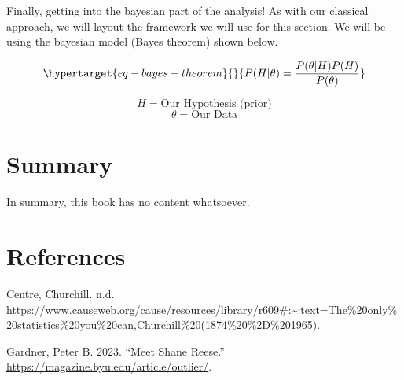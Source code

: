 \documentclass[
  letterpaper,
  DIV=11,
  numbers=noendperiod]{scrreprt}
\newlength{\cslhangindent}
\newlength{\cslentryspacingunit} %
\newenvironment{CSLReferences}[2] %
 {%
  \setlength{\parindent}{0pt}
  \ifodd #1
  \let\oldpar\par
  \def\par{\hangindent=\cslhangindent\oldpar}
  \fi
  \setlength{\parskip}{#2\cslentryspacingunit}
 }%
 {}
\begin{document}
Finally, getting into the bayesian part of the analysis! As with our
classical approach, we will layout the framework we will use for this
section. We will be using the bayesian model (Bayes theorem) shown
below.

\begin{equation}\protect\hypertarget{eq-bayes-theorem}{}{P(H|\theta) = \frac{P(\theta|H) P(H)}{P(\theta)}}\label{eq-bayes-theorem}\end{equation}

\[H = \text{Our Hypothesis (prior)}\] \[\theta = \text{Our Data}\]

\hypertarget{summary}{%
\chapter{Summary}\label{summary}}

In summary, this book has no content whatsoever.

\hypertarget{references}{%
\chapter*{References}\label{references}}


\hypertarget{refs}{}
\begin{CSLReferences}{1}{0}
\leavevmode{}%
Centre, Churchill. n.d.
\url{https://www.causeweb.org/cause/resources/library/r609\#:~:text=The\%20only\%20statistics\%20you\%20can,Churchill\%20(1874\%20\%2D\%201965).}

\leavevmode{}%
Gardner, Peter B. 2023. {``Meet Shane Reese.''}
\url{https://magazine.byu.edu/article/outlier/}.

\end{CSLReferences}
\end{document}
